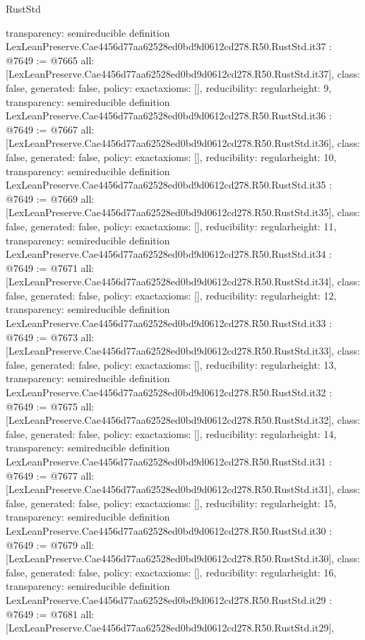 \begin{lexlean}{RustStd}
\begin{coremodule}
{  transparency: semireducible
}
definition LexLeanPreserve.Cae4456d77aa62528ed0bd9d0612cd278.R50.RustStd.it37 : @7649 := @7665 {
  all: [LexLeanPreserve.Cae4456d77aa62528ed0bd9d0612cd278.R50.RustStd.it37],
  class: false,
  generated: false,
  policy: exact{axioms: []},
  reducibility: regular{height: 9},
  transparency: semireducible
}
definition LexLeanPreserve.Cae4456d77aa62528ed0bd9d0612cd278.R50.RustStd.it36 : @7649 := @7667 {
  all: [LexLeanPreserve.Cae4456d77aa62528ed0bd9d0612cd278.R50.RustStd.it36],
  class: false,
  generated: false,
  policy: exact{axioms: []},
  reducibility: regular{height: 10},
  transparency: semireducible
}
definition LexLeanPreserve.Cae4456d77aa62528ed0bd9d0612cd278.R50.RustStd.it35 : @7649 := @7669 {
  all: [LexLeanPreserve.Cae4456d77aa62528ed0bd9d0612cd278.R50.RustStd.it35],
  class: false,
  generated: false,
  policy: exact{axioms: []},
  reducibility: regular{height: 11},
  transparency: semireducible
}
definition LexLeanPreserve.Cae4456d77aa62528ed0bd9d0612cd278.R50.RustStd.it34 : @7649 := @7671 {
  all: [LexLeanPreserve.Cae4456d77aa62528ed0bd9d0612cd278.R50.RustStd.it34],
  class: false,
  generated: false,
  policy: exact{axioms: []},
  reducibility: regular{height: 12},
  transparency: semireducible
}
definition LexLeanPreserve.Cae4456d77aa62528ed0bd9d0612cd278.R50.RustStd.it33 : @7649 := @7673 {
  all: [LexLeanPreserve.Cae4456d77aa62528ed0bd9d0612cd278.R50.RustStd.it33],
  class: false,
  generated: false,
  policy: exact{axioms: []},
  reducibility: regular{height: 13},
  transparency: semireducible
}
definition LexLeanPreserve.Cae4456d77aa62528ed0bd9d0612cd278.R50.RustStd.it32 : @7649 := @7675 {
  all: [LexLeanPreserve.Cae4456d77aa62528ed0bd9d0612cd278.R50.RustStd.it32],
  class: false,
  generated: false,
  policy: exact{axioms: []},
  reducibility: regular{height: 14},
  transparency: semireducible
}
definition LexLeanPreserve.Cae4456d77aa62528ed0bd9d0612cd278.R50.RustStd.it31 : @7649 := @7677 {
  all: [LexLeanPreserve.Cae4456d77aa62528ed0bd9d0612cd278.R50.RustStd.it31],
  class: false,
  generated: false,
  policy: exact{axioms: []},
  reducibility: regular{height: 15},
  transparency: semireducible
}
definition LexLeanPreserve.Cae4456d77aa62528ed0bd9d0612cd278.R50.RustStd.it30 : @7649 := @7679 {
  all: [LexLeanPreserve.Cae4456d77aa62528ed0bd9d0612cd278.R50.RustStd.it30],
  class: false,
  generated: false,
  policy: exact{axioms: []},
  reducibility: regular{height: 16},
  transparency: semireducible
}
definition LexLeanPreserve.Cae4456d77aa62528ed0bd9d0612cd278.R50.RustStd.it29 : @7649 := @7681 {
  all: [LexLeanPreserve.Cae4456d77aa62528ed0bd9d0612cd278.R50.RustStd.it29],
}
\end{coremodule}
\end{lexlean}
